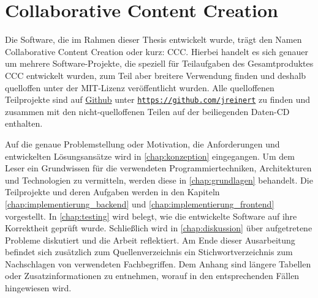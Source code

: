 \section{Collaborative Content Creation}
\label{sec:e_collaborative_content_creation}

Die Software, die im Rahmen dieser Thesis entwickelt wurde, trägt den Namen
Collaborative Content Creation oder kurz: CCC.  Hierbei handelt es sich genauer
um mehrere Software-Projekte, die speziell für Teilaufgaben des Gesamtproduktes
CCC entwickelt wurden, zum Teil aber breitere Verwendung finden und deshalb
quelloffen unter der MIT-Lizenz \cite{mit} veröffentlicht wurden.  Alle
quelloffenen Teilprojekte sind auf \href{https://github.com}{Github} unter
\texttt{\href{https://github.com/jreinert}{https://github.com/jreinert}} zu
finden und zusammen mit den nicht-quelloffenen Teilen auf der beiliegenden
Daten-CD enthalten.

Auf die genaue Problemstellung oder Motivation, die Anforderungen und
entwickelten Lösungsansätze wird in \cref{chap:konzeption} eingegangen.  Um dem
Leser ein Grundwissen für die verwendeten Programmiertechniken, Architekturen
und Technologien zu vermitteln, werden diese in \cref{chap:grundlagen}
behandelt.  Die Teilprojekte und deren Aufgaben werden in den Kapiteln
\ref{chap:implementierung_backend} und \ref{chap:implementierung_frontend}
vorgestellt.  In \cref{chap:testing} wird belegt, wie die entwickelte
Software auf ihre Korrektheit geprüft wurde.  Schließlich wird in
\cref{chap:diskussion} über aufgetretene Probleme diskutiert und die Arbeit
reflektiert.  Am Ende dieser Ausarbeitung befindet sich zusätzlich zum
Quellenverzeichnis ein Stichwortverzeichnis zum Nachschlagen von verwendeten
Fachbegriffen.  Dem Anhang sind längere Tabellen oder Zusatzinformationen
zu entnehmen, worauf in den entsprechenden Fällen hingewiesen wird.
